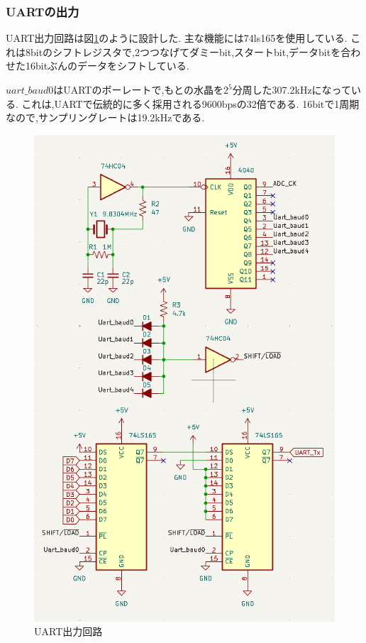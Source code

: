 \documentclass[a4paper,10pt]{article}
\begin{document}
\begin{multicols}{2}
\subsubsection{UARTの出力}
UART出力回路は図\ref{fig:uart_tx}のように設計した.
主な機能には74ls165を使用している.
これは8bitのシフトレジスタで,2つつなげてダミーbit,スタートbit,データbitを合わせた16bitぶんのデータをシフトしている.

$uart\_baud0$はUARTのボーレートで,もとの水晶を$2^5$分周した307.2kHzになっている.
これは,UARTで伝統的に多く採用される9600bpsの32倍である.
16bitで1周期なので,サンプリングレートは19.2kHzである.

\begin{figure}[H]
    \centering
    \includegraphics[width=\linewidth]{figure/uart_tx.png} 
    \caption{UART出力回路} 
    \label{fig:uart_tx}
\end{figure}


\end{multicols}
\end{document}
